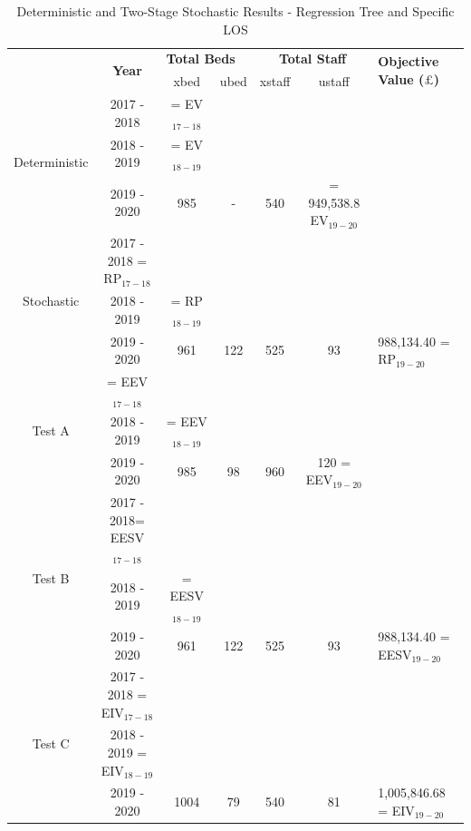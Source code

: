 \documentclass[../thesis.tex]{subfiles}
\begin{document}
\begin{table}[h!]
    \centering
    \begin{tabular}{ccccccl}\toprule
 & \multirow{2}{*}{\textbf{Year}}& \multicolumn{2}{l}{\textbf{Total Beds}} & \multicolumn{2}{c}{\textbf{Total Staff}} & \multirow{2}{*}{\textbf{Objective Value ($\pounds$)}}\\ \cmidrule(lr){3-4} \cmidrule(lr){5-6}
&& xbed           & ubed          & xstaff         & ustaff         \\ \midrule
     \multirow{3}{*}{Deterministic} & 2017 - 2018 & 
 =  EV$_{17-18}$ \\ 
      & 2018 - 2019 & =  EV$_{18-19}$ \\
      & 2019 - 2020 &  985 & - & 540 & = 949,538.8 EV$_{19-20}$\\\midrule
     \multirow{3}{*}{Stochastic} & 2017 - 2018  =  RP$_{17-18}$ \\ 
      & 2018 - 2019 & =  RP$_{18-19}$ \\
      & 2019 - 2020 & 961 & 122 &525 &93 & 988,134.40 =  RP$_{19-20}$\\ \midrule
      \multirow{3}{*}{Test A} & = EEV$_{17-18}$\\
      & 2018 - 2019 & = EEV$_{18-19}$\\
      & 2019 - 2020 & 985 & 98 & 960 & 120 = EEV$_{19-20}$\\\midrule
      \multirow{3}{*}{Test B} & 2017 - 2018= EESV$_{17-18}$\\
      & 2018 - 2019 & = EESV$_{18-19}$\\
      & 2019 - 2020 & 961 & 122 &525 &93 & 988,134.40  = EESV$_{19-20}$\\\midrule
       \multirow{3}{*}{Test C}& 2017 - 2018 = EIV$_{17-18}$\\
      & 2018 - 2019 = EIV$_{18-19}$\\
      & 2019 - 2020 & 1004 & 79& 540 & 81& 1,005,846.68 = EIV$_{19-20}$\\\bottomrule      
    \end{tabular}
    \caption{Deterministic and Two-Stage Stochastic Results - Regression Tree and Specific LOS }
    \label{tab:ResultsX}
\end{table}
\end{document}
